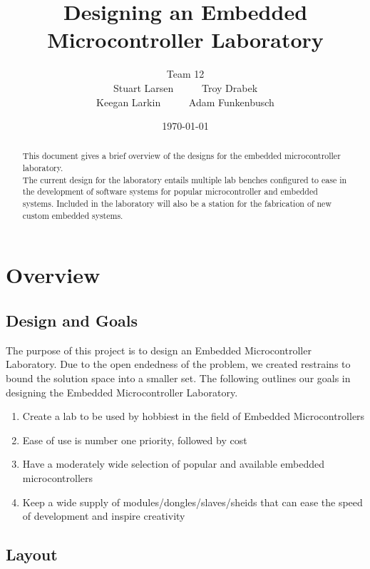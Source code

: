 \documentclass[12pt]{article}
\title{Designing an Embedded Microcontroller Laboratory}
\author{Team 12 \\ Stuart Larsen \ \ \ \ \   Troy Drabek \\ Keegan Larkin \ \ \ \ \   Adam Funkenbusch }
\date{\today}
\begin{document}
\maketitle
\thispagestyle{empty}

\pagebreak
\begin{abstract}

  This document gives a brief overview of the designs for the embedded microcontroller laboratory. \\

  \noindent
  The current design for the laboratory entails multiple lab benches configured to ease in the development of software systems for popular microcontroller and embedded systems. Included in the laboratory will also be a station for the fabrication of new custom embedded systems.

\end{abstract}

\thispagestyle{empty}
\pagebreak

\tableofcontents
\thispagestyle{empty}
\pagebreak
\setcounter{page}{1}


\section{Overview}

\subsection{Design and Goals}
The purpose of this project is to design an Embedded Microcontroller Laboratory. Due to the open endedness of the problem, we created restrains to bound the solution space into a smaller set. The following outlines our goals in designing the Embedded Microcontroller Laboratory.

\begin{enumerate}
  \item Create a lab to be used by hobbiest in the field of Embedded Microcontrollers
  \item Ease of use is number one priority, followed by cost
  \item Have a moderately wide selection of popular and available embedded microcontrollers
  \item Keep a wide supply of modules/dongles/slaves/sheids that can ease the speed of development and inspire creativity
\end{enumerate}

\subsection{Layout}
\end{document}
